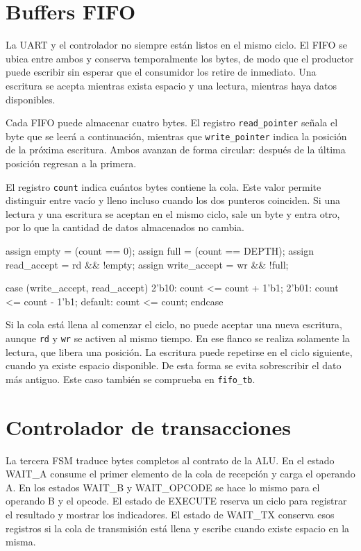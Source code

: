 \section{Buffers FIFO}

La UART y el controlador no siempre están listos en el mismo ciclo.
El FIFO se ubica entre ambos y conserva temporalmente los bytes, de
modo que el productor puede escribir sin esperar que el consumidor
los retire de inmediato. Una escritura se acepta mientras exista
espacio y una lectura, mientras haya datos disponibles.

Cada FIFO puede almacenar cuatro bytes. El registro
\texttt{read\_pointer} señala el byte que se leerá a continuación,
mientras que \texttt{write\_pointer} indica la posición de la próxima
escritura. Ambos avanzan de forma circular: después de la última
posición regresan a la primera.

El registro \texttt{count} indica cuántos bytes contiene la cola.
Este valor permite distinguir entre vacío y lleno incluso cuando los
dos punteros coinciden. Si una lectura y una escritura se aceptan en
el mismo ciclo, sale un byte y entra otro, por lo que la cantidad de
datos almacenados no cambia.

\begin{codebox}[language=SystemVerilog]
assign empty = (count == 0);
assign full  = (count == DEPTH);
assign read_accept  = rd && !empty;
assign write_accept = wr && !full;

case ({write_accept, read_accept})
  2'b10:   count <= count + 1'b1;
  2'b01:   count <= count - 1'b1;
  default: count <= count;
endcase
\end{codebox}

Si la cola está llena al comenzar el ciclo, no puede aceptar una
nueva escritura, aunque \texttt{rd} y \texttt{wr} se activen al mismo
tiempo. En ese flanco se realiza solamente la lectura, que libera una
posición. La escritura puede repetirse en el ciclo siguiente, cuando
ya existe espacio disponible. De esta forma se evita sobrescribir el
dato más antiguo. Este caso también se comprueba en \texttt{fifo\_tb}.

\section{Controlador de transacciones}\label{sec:controlador-transacciones}

La tercera FSM traduce bytes completos al contrato de la ALU. En el
estado WAIT\_A consume el primer elemento de la cola de recepción y
carga el operando A. En los estados WAIT\_B y WAIT\_OPCODE se hace lo
mismo para el operando B y el opcode. El estado de EXECUTE reserva un
ciclo para registrar el resultado y mostrar los indicadores. El
estado de WAIT\_TX conserva esos registros si la cola de transmisión
está llena y escribe cuando existe espacio en la misma.

